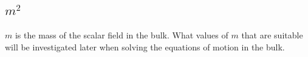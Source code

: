 \documentclass[12pt]{report}
\newcommand{\e}{\ensuremath{\mathrm{e}}}
\renewcommand{\i}{\ensuremath{i}}
\newcommand{\ket}[1]{|#1\rangle}
\newcommand{\bra}[1]{\langle#1|}
\newcommand{\bracket}[3]{\bra{#1}#2\ket{#3}}
\begin{document}
\subsection{$m^2$}
$m$ is the mass of the scalar field in the bulk. What values of $m$ that are suitable will be investigated later when solving the equations of motion in the bulk.



\end{document}
